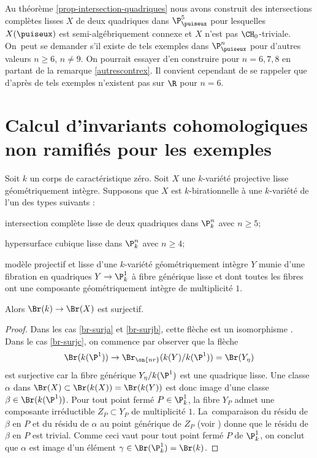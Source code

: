 \begin{rmk}
Au théorème \ref{prop-intersection-quadriques} nous avons construit des intersections complètes lisses $X$ de deux
quadriques dans $\P^5_{\puiseux}$ pour lesquelles $X(\puiseux)$ est semi-algébriquement connexe et $X$ n'est pas $\CH_0$-triviale. On~peut se demander s'il existe de tels exemples dans $\P^n_{\puiseux}$ pour d'autres valeurs $n\geq 6$, $n\neq 9$.
On pourrait essayer d'en construire pour
$n=6,7,8$ en partant de la remarque \ref{autrescontrex}.
Il convient cependant de se rappeler que d'après \cite{hassett2022rationality}
de tels exemples n'existent pas sur $\R$ pour $n=6$.
\end{rmk}

\section{Calcul d'invariants cohomologiques non ramifiés pour les exemples}\label{calcul}

\begin{prop}\label{br-surj}
Soit $k$ un corps de caractéristique zéro.
Soit $X$ une $k$-variété projective lisse
géométriquement intègre. Supposons que $X$ est $k$-birationnelle à une $k$-variété
de l'un des types suivants :

\begin{enumeratea}
\item\label{br-surja}
intersection complète lisse de deux quadriques dans $\P^n_{k}$ avec $n \geq 5$;
\item\label{br-surjb}
hypersurface cubique lisse dans $\P^n_{k}$ avec $n \geq 4$;
\item\label{br-surjc}
modèle projectif et lisse d'une $k$-variété géométriquement intègre $Y$ munie d'une
fibration en quadriques $Y \to \P^1_k$ à fibre générique lisse et dont toutes les fibres ont une composante géométriquement intègre de multiplicité $1$.
\end{enumeratea}

Alors $\Br(k) \to \Br(X)$ est surjectif.
\end{prop}

\begin{proof}

Dans les cas \eqref{br-surja} et \eqref{br-surjb}, cette flèche est un isomorphisme \cite[Th.\,8.3.2]{colliot2021brauer}.
Dans le cas \eqref{br-surjc}, on commence par observer que la flèche
\[\Br(k(\P^1)) \to \Br_{\on{nr}}(k(Y)/k(\P^1))= \Br(Y_{\eta})\] est surjective car la fibre générique $Y_{\eta}/k(\P^1)$
est une quadrique lisse. Une classe $\alpha$ dans $\Br(X) \subset \Br(k(X))= \Br(k(Y))$
est donc image d'une classe $\beta \in \Br(k(\P^1))$. Pour tout point fermé $P\in \P^1_k$, la fibre $Y_P$ admet une composante irréductible $Z_P\subset Y_P$ de multiplicité $1$. La~comparaison du résidu de $\beta$ en $P$ et du résidu de $\alpha$ au point générique de $Z_P$ (voir \cite[Cor.\,11.1.6]{colliot2021brauer}) donne que le résidu de $\beta$ en $P$ est trivial. Comme ceci vaut pour tout point fermé $P$ de $\P^1_k$, on conclut que $\alpha$ est image d'un élément $\gamma \in \Br(\P^1_{k})=\Br(k)$.
\end{proof}

